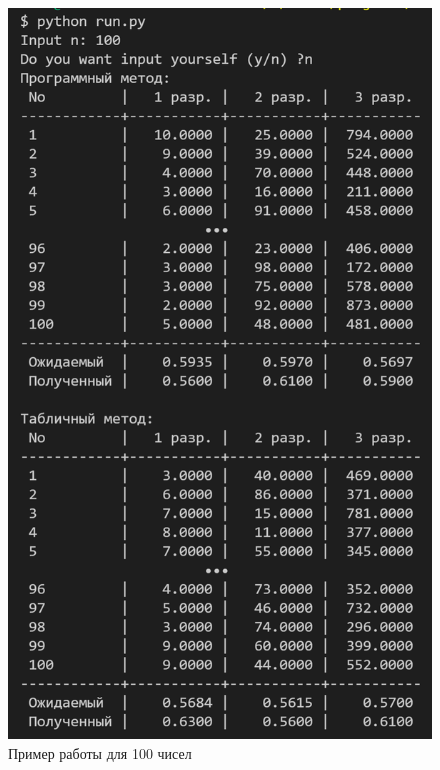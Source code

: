 \documentclass[a4paper, 12pt]{article}
\begin{document}
\begin{figure}[t!]
	\centering \includegraphics[scale=1]{100}
	\centering\caption{Пример работы для 100 чисел}
\end{figure}
\clearpage
\newpage
\end{document}
